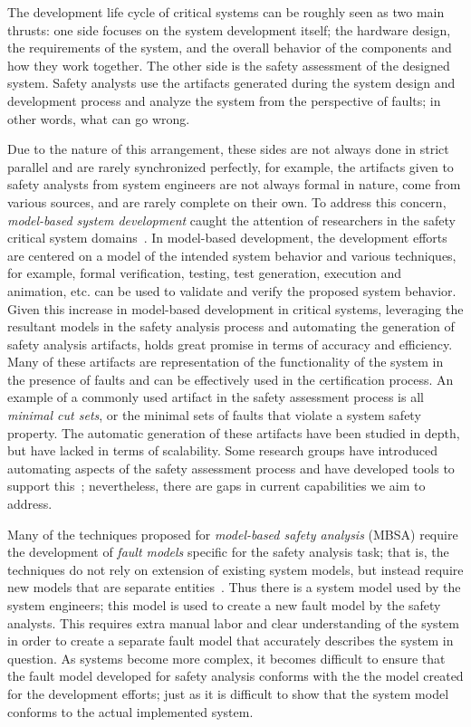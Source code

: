 The development life cycle of critical systems can be roughly seen as two main thrusts: one side focuses on the system development itself; the hardware design, the requirements of the system, and the overall behavior of the components and how they work together. The other side is the safety assessment of the designed system. Safety analysts use the artifacts generated during the system design and development process and analyze the system from the perspective of faults; in other words, what can go wrong. 

Due to the nature of this arrangement, these sides are not always done in strict parallel and are rarely synchronized perfectly, for example, the artifacts given to safety analysts from system engineers are not always formal in nature, come from various sources, and are rarely complete on their own. To address this concern, \emph{model-based system development} caught the attention of researchers in the safety critical system domains~\cite{Joshi05:Dasc,CAV2015:BoCiGrMa,info17:HaLuHo,5979344,Gudemann:2010:FQQ:1909626.1909813}. In model-based development, the development efforts are centered on a model of the intended system behavior and various techniques, for example, formal verification, testing, test generation, execution and animation, etc. can be used to validate and verify the proposed system behavior. Given this increase in model-based development in critical systems, leveraging the resultant models in the safety analysis process and automating the generation of safety analysis artifacts, holds great promise in terms of accuracy and efficiency. Many of these artifacts are representation of the functionality of the system in the presence of faults and can be effectively used in the certification process. An example of a commonly used artifact in the safety assessment process is all \emph{minimal cut sets}, or the minimal sets of faults that violate a system safety property. The automatic generation of these artifacts have been studied in depth, but have lacked in terms of scalability. Some research groups have introduced automating aspects of the safety assessment process and have developed tools to support this~\cite{Joshi05:SafeComp,CAV2015:BoCiGrMa,10.1007/978-3-319-11936-6-7}; nevertheless, there are gaps in current capabilities we aim to address. 

Many of the techniques proposed for \emph{model-based safety analysis} (MBSA) require the development of {\em fault models} specific for the safety analysis task; that is, the techniques do not rely on extension of existing system models, but instead require new models that are separate entities~\cite{symbAltaRica, DBLP:conf/tacas/BittnerBCCGGMMZ16, info8010007, Gudemann:2010:FQQ:1909626.1909813}. Thus there is a system model used by the system engineers; this model is used to create a new fault model by the safety analysts. This requires extra manual labor and clear understanding of the system in order to create a separate fault model that accurately describes the system in question. As systems become more complex, it becomes difficult to ensure that the fault model developed for safety analysis conforms with the the model created for the development efforts; just as it is difficult to show that the system model conforms to the actual implemented system. 

